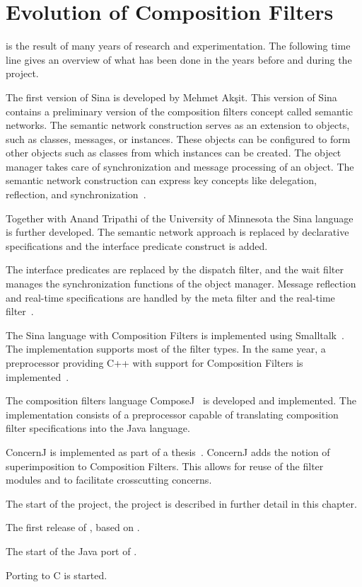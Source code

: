 \section{Evolution of Composition Filters}
\Compose* is the result of many years of research and experimentation.
The following time line gives an overview of what has been done in the years before and during the \Compose* project.
\begin{description}[noitemsep,style=nextline,leftmargin=15mm]
\item[1985] The first version of Sina is developed by Mehmet Ak\c{s}it.
            This version of Sina contains a preliminary version of the composition filters concept called semantic networks.
            The semantic network construction serves as an extension to objects, such as classes, messages, or instances.
            These objects can be configured to form other objects such as classes from which instances can be created.
            The object manager takes care of synchronization and message processing of an object.
            The semantic network construction can express key concepts like delegation, reflection, and synchronization~\cite{koopmans:sina95}.
\item[1987] Together with Anand Tripathi of the University of Minnesota the Sina language is further developed.
            The semantic network approach is replaced by declarative specifications and the interface predicate construct is added.
\item[1991] The interface predicates are replaced by the dispatch filter, and the wait filter manages the synchronization functions of the object manager.
            Message reflection and real-time specifications are handled by the meta filter and the real-time filter~\cite{bergmans:phd94}.
\item[1995] The Sina language with Composition Filters is implemented using Smalltalk~\cite{koopmans:sina95}.
            The implementation supports most of the filter types.
            In the same year, a preprocessor providing C++ with support for Composition Filters is implemented~\cite{glandrup:ms95}.
\item[1999] The composition filters language ComposeJ~\cite{wichman:ms99} is developed and implemented.
            The implementation consists of a preprocessor capable of translating composition filter specifications into the Java language.
\item[2001] ConcernJ is implemented as part of a \MSc thesis~\cite{salinas:ms01}.
            ConcernJ adds the notion of superimposition to Composition Filters.
            This allows for reuse of the filter modules and to facilitate crosscutting concerns.
\item[2003] The start of the \Compose* project, the project is described in further detail in this chapter.
\item[2004] The first release of \Compose*, based on \dotNET.
\item[2005] The start of the Java port of \Compose*.
\item[2006] Porting \Compose* to C is started.
\end{description}